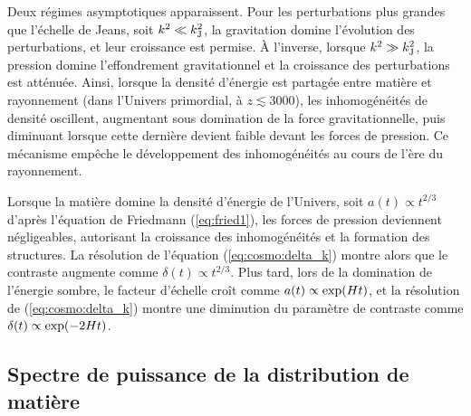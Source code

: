 Deux régimes asymptotiques apparaissent.
Pour les perturbations plus grandes que l'échelle de Jeans, soit $k^2 \ll k_{\rm J}^2$, la gravitation domine l'évolution des perturbations, et leur croissance est permise.
À l'inverse, lorsque $k^2 \gg k_{\rm J}^2$, la pression domine l'effondrement gravitationnel et la croissance des perturbations est atténuée.
Ainsi, lorsque la densité d'énergie est partagée entre matière et rayonnement (dans l'Univers primordial, à $z \lesssim 3000$), les inhomogénéités de densité oscillent, augmentant sous domination de la force gravitationnelle, puis diminuant lorsque cette dernière devient faible devant les forces de pression.
Ce mécanisme empêche le développement des inhomogénéités au cours de l'ère du rayonnement. %

Lorsque la matière domine la densité d'énergie de l'Univers, soit $a(t) \propto t^{2/3}$ d'après l'équation de Friedmann (\ref{eq:fried1}), les forces de pression deviennent négligeables, autorisant la croissance des inhomogénéités et la formation des structures.
La résolution de l'équation (\ref{eq:cosmo:delta_k}) montre alors que le contraste augmente comme $\delta(t) \propto t^{2/3}$.
Plus tard, lors de la domination de l'énergie sombre, le facteur d'échelle croît comme $a(t) \propto {\rm exp}(Ht)$, et la résolution de (\ref{eq:cosmo:delta_k}) montre une diminution du paramètre de contraste comme $\delta(t) \propto {\rm exp}(-2Ht)$.

\subsection{Spectre de puissance de la distribution de matière}

